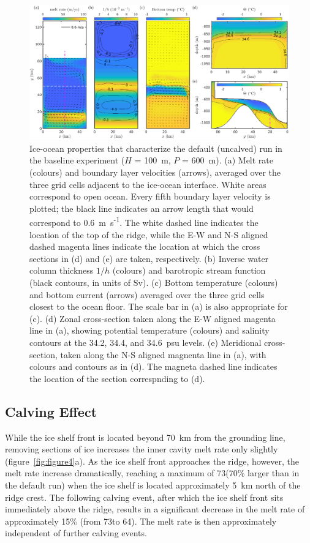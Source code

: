 \documentclass[draft]{agujournal2019}
\begin{document}
\begin{figure}
    \centering
    \includegraphics[width = \textwidth]{../make_figures/plots/figure3.eps}
    \caption{Ice-ocean properties that characterize the default (uncalved) run in the baseline experiment ($H$ = 100~m, $P$ = 600~m). (a) Melt rate (colours) and boundary layer velocities (arrows), averaged over the three grid cells adjacent to the ice-ocean interface. White areas correspond to open ocean. Every fifth boundary layer velocity is plotted; the black line indicates an arrow length that would correspond to 0.6~m~s\textsuperscript{-1}. The white dashed line indicates the location of the top of the ridge, while the E-W and N-S aligned dashed magenta lines indicate the location at which the cross sections in (d) and (e) are taken, respectively. (b) Inverse water column thickness $1/h$ (colours) and barotropic stream function (black contours, in units of Sv). (c) Bottom temperature (colours) and bottom current (arrows) averaged over the three grid cells closest to the ocean floor. The scale bar in (a) is also appropriate for (c). (d) Zonal cross-section taken along the E-W aligned magenta line in (a), showing potential temperature (colours) and salinity contours at the 34.2, 34.4, and 34.6~psu levels. (e) Meridional cross-section, taken along the N-S aligned magnenta line in (a), with colours and contours as in (d). The magneta dashed line indicates the location of the section correspnding to (d).}
    \label{fig:figure3}
\end{figure}

\subsection{Calving Effect}
While the ice shelf front is located beyond 70~km from the grounding line, removing sections of ice increases the inner cavity melt rate only slightly (figure~\ref{fig:figure4}a). As the ice shelf front approaches the ridge, however, the melt rate increase dramatically, reaching a maximum of 73\mpryr (70\% larger than in the default run) when the ice shelf is located approximately 5~km north of the ridge crest. The following calving event, after which the ice shelf front sits immediately above the ridge, results in a significant decrease in the melt rate of approximately 15\%  (from 73\mpryr to 64\mpryr). The melt rate is then approximately independent of further calving events.
\end{document}
